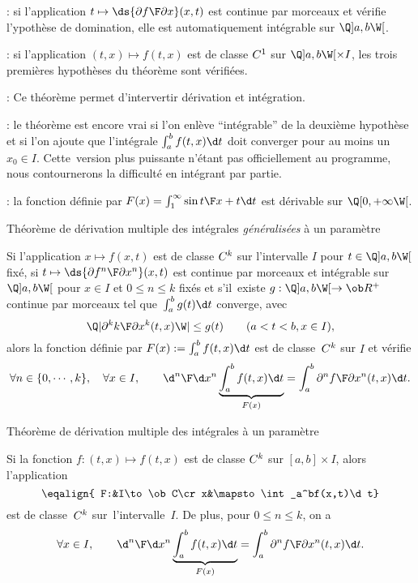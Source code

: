\Remarque : si l'application $t\mapsto\ds{\partial f\F\partial x}(x,t)$ est continue par morceaux et vérifie l'ypothèse de domination, elle est automatiquement intégrable sur $\Q]a,b\W[$. 
\bigskip

\Remarque : si l'application $(t,x)\mapsto f(t,x)$ est de classe $\sc C^1$ sur $\Q]a,b\W[\times I$, les trois premières hypothèses du théorème sont vérifiées. 
\bigskip

\Remarque : Ce théorème permet d'intervertir dérivation et intégration. 
\bigskip

\Remarque : le théorème est encore vrai si l'on enlève ``intégrable'' de la deuxième hypothèse et si l'on ajoute que l'intégrale $\int_a^bf(t,x)\d t$ doit converger pour au moins un $x_0\in I$. 
Cette~version plus puissante n'étant pas officiellement au programme, nous contournerons la difficulté en intégrant par partie. 
\bigskip

\Application : la fonction définie par $F(x)=\int_1^\infty{\sin t\F x+t}\d t$ est dérivable sur $\Q[0, +\infty\W[$. 

\Concept [Index=Theoreme@Théorème!de derivation des integrales a un parametre@de dérivation des intégrales à un paramètre] Théorème de dérivation multiple des intégrales {\it généralisées} à un paramètre

Si l'application $x\mapsto f(x,t)$ est de classe $\sc C^k$ sur l'intervalle $I$ pour $t\in\Q]a,b\W[$ fixé, \pn
si $t\mapsto\ds{\partial f^n\F\partial x^n}(x,t)$ est continue par morceaux et intégrable sur $\Q]a,b\W[$ pour $x\in I$ et $0\le n\le k$ fixés et 
s'il~existe $g:\Q]a,b\W[\to\ob R^+$continue par morceaux tel que~$\int_a^bg(t)\d t$ converge, avec 
$$
\Q|{\partial^kk\F\partial x^k}(t,x)\W|\le g(t)\qquad(a<t<b, x\in I),
$$
alors la fonction définie par $F(x):=\int_a^bf(t,x)\d t$ est de classe~$\sc C^k$ sur $I$ et vérifie
$$
\forall n\in\{0, \cdots, k\}, \quad \forall x\in I, \qquad {\d^n\F\d x^n}\underbrace{\int_a^bf(t,x)\d t}_{F(x)}=\int_a^b{\partial^n f\F\partial x^n}(t,x)\d t. 
$$


\Concept [Index=Theoreme@Théorème!de derivation des integrales a un parametre@de dérivation des intégrales à un paramètre] Théorème de dérivation multiple des intégrales à un paramètre

Si la fonction $f:(t,x)\mapsto f(t,x)$ est de classe $\sc C^k$ sur $[a,b]\times I$, alors l'application 
$$
\eqalign{
F:&I\to\ob C\cr
x&\mapsto\int_a^bf(x,t)\d t}
$$
est de classe~$\sc C^k$ sur~l'intervalle~$I$. De plus, pour $0\le n\le k$, on a 
$$
\forall x\in I, \qquad {\d^n\F\d x^n}\underbrace{\int_a^bf(t,x)\d t}_{F(x)}=\int_a^b{\partial^n f\F\partial x^n}(t,x)\d t. 
$$


